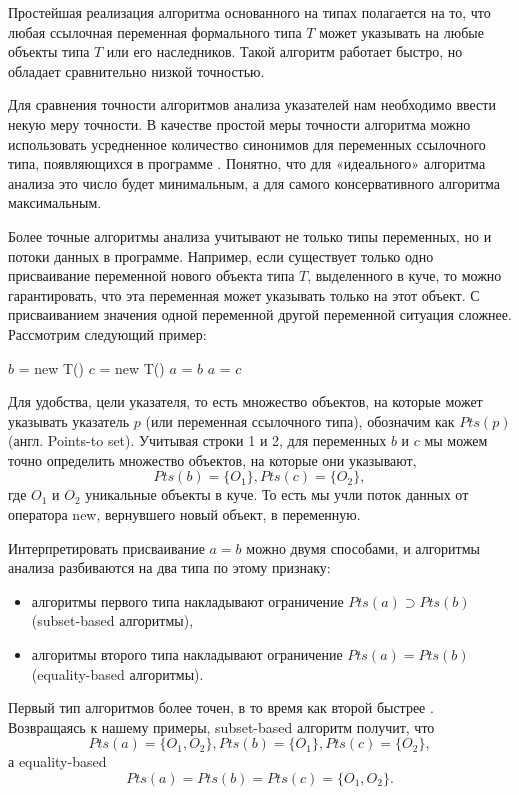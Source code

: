 \documentclass[14pt,titlepage]{extarticle}
\newcommand{\eng}[1]{{\English#1}}
\begin{document}
    Простейшая реализация алгоритма основанного на типах полагается на то, что
    любая ссылочная переменная формального типа $T$ может указывать на любые
    объекты типа $T$ или его наследников. Такой алгоритм работает быстро,
    но обладает сравнительно низкой точностью.

    Для сравнения точности алгоритмов анализа указателей нам необходимо ввести
    некую меру точности. В качестве простой меры точности алгоритма можно
    использовать усредненное количество синонимов для переменных ссылочного
    типа, появляющихся в программе \cite{hind_pointer_analysis_not_solved_yet}.
    Понятно, что для «идеального» алгоритма анализа это число будет
    минимальным, а для самого консервативного алгоритма максимальным.

    Более точные алгоритмы анализа учитывают не только типы переменных,
    но и потоки данных в программе. Например, если существует только
    одно присваивание переменной нового объекта типа $T$, выделенного в куче,
    то можно гарантировать, что эта переменная может указывать только
    на этот объект.
    С присваиванием значения одной переменной другой переменной ситуация
    сложнее.
    Рассмотрим следующий пример:
    \begin{algorithmic}[1]
    \STATE $b$ = new T()
    \STATE $c$ = new T()
    \STATE $a$ = $b$
    \STATE $a$ = $c$
    \end{algorithmic}
    Для удобства, цели указателя, то есть множество объектов, на которые может
    указывать указатель $p$ (или переменная ссылочного типа), обозначим как
    $Pts(p)$ (англ. \eng{Points-to set}).
    Учитывая строки 1 и 2, для переменных $b$ и $c$ мы можем точно определить
    множество объектов, на которые они указывают,
    \[Pts(b) = \{O_1\}, Pts(c) = \{O_2\},\] где $O_1$ и $O_2$ уникальные
    объекты в куче. То есть мы учли поток данных от оператора new,
    вернувшего новый объект, в переменную.

    Интерпретировать присваивание $a = b$ можно двумя способами,
    и алгоритмы анализа разбиваются на два типа по этому признаку:
    \begin{itemize}
      \item алгоритмы первого типа накладывают ограничение
            $Pts(a) \supset Pts(b)$ (\eng{subset-based} алгоритмы),
      \item алгоритмы второго типа накладывают ограничение
            $Pts(a) = Pts(b)$ (\eng{equality-based} алгоритмы).
    \end{itemize}
    Первый тип алгоритмов более точен, в то время как второй быстрее
    \cite{steensgaard}. Возвращаясь к нашему примеры, \eng{subset-based}
    алгоритм получит, что
    \[Pts(a) = \{O_1, O_2\}, Pts(b) = \{O_1\}, Pts(c) = \{O_2\},\]
    а \eng{equality-based}
    \[Pts(a) = Pts(b) = Pts(c) = \{O_1, O_2\}.\]
\end{document}
